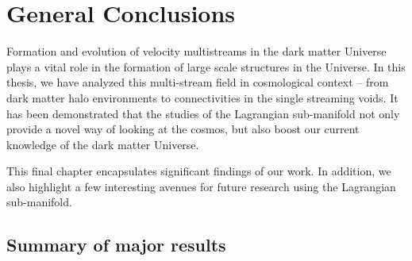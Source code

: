 
\chapter{General Conclusions}\label{chapter6}

Formation and evolution of velocity multistreams in the dark matter Universe plays a vital role in the formation of large scale structures in the Universe. In this thesis, we have analyzed this multi-stream field in cosmological context -- from dark matter halo environments to connectivities in the single streaming voids. It has been demonstrated that the studies of the Lagrangian sub-manifold not only provide a novel way of looking at the cosmos, but also boost our current knowledge of the dark matter Universe. 

This final chapter encapsulates significant findings of our work. In addition, we also highlight a few interesting avenues for future research using the Lagrangian sub-manifold.      





% 

\section{Summary of major results}

